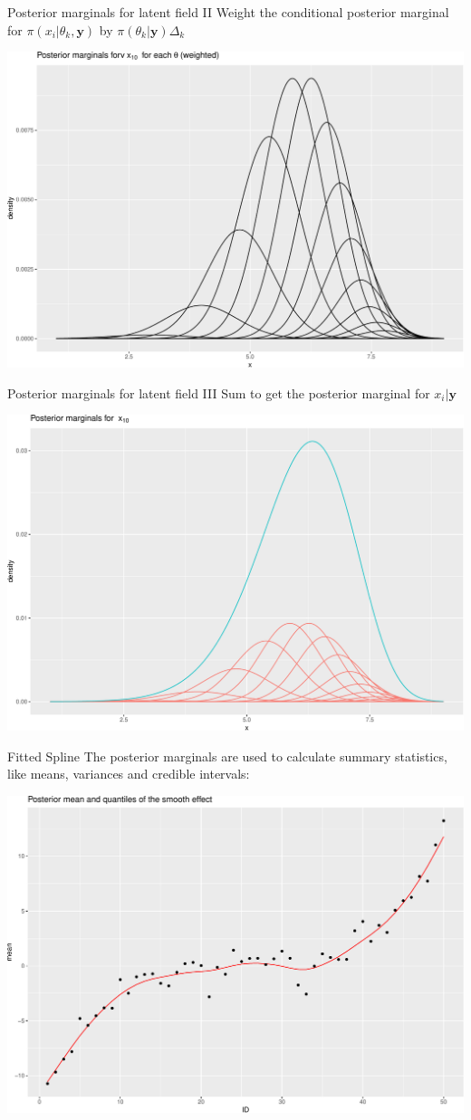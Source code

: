 \documentclass[
  ignorenonframetext,
]{beamer}
\begin{document}
\begin{frame}{Posterior marginals for latent field II}
\protect\hypertarget{posterior-marginals-for-latent-field-ii}{}
Weight the conditional posterior marginal for
\(\pi(x_i|\theta_k, \mathbf{y})\) by
\(\pi(\theta_k|\mathbf{y})\Delta_k\)

\begin{center}\includegraphics[width=0.6\linewidth]{Part2_deterministic_files/figure-beamer/unnamed-chunk-4-1} \end{center}
\end{frame}

\begin{frame}{Posterior marginals for latent field III}
\protect\hypertarget{posterior-marginals-for-latent-field-iii}{}
Sum to get the posterior marginal for \(x_i|\mathbf{y}\)

\begin{center}\includegraphics[width=0.6\linewidth]{Part2_deterministic_files/figure-beamer/unnamed-chunk-5-1} \end{center}
\end{frame}

\begin{frame}{Fitted Spline}
\protect\hypertarget{fitted-spline}{}
The posterior marginals are used to calculate summary statistics, like
means, variances and credible intervals:

\begin{center}\includegraphics[width=0.6\linewidth]{Part2_deterministic_files/figure-beamer/unnamed-chunk-6-1} \end{center}
\end{frame}
\end{document}
